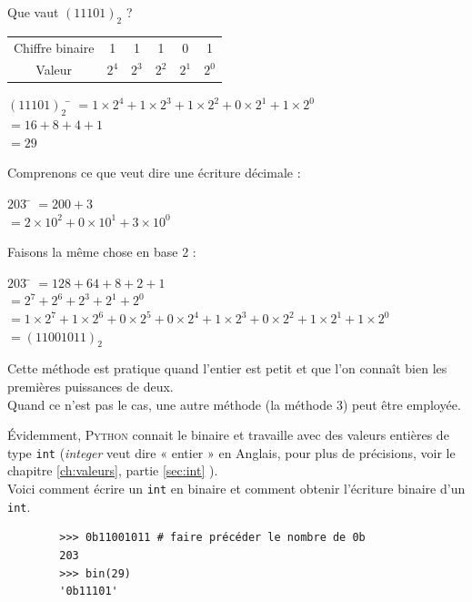 \begin{methode}
    Que vaut $(11101)_2$ ?
    \begin{center}
        \alternaterowcolors[UGLiPurple]
        \begin{tabular}{CCCCCC}
            Chiffre binaire & 1     & 1     & 1     & 0     & 1     \\
            Valeur          & $2^4$ & $2^3$ & $2^2$ & $2^1$ & $2^0$ \\
        \end{tabular}
    \end{center}
    \begin{tabbing}
        $(11101)_2$	\= 	$=1\times 2^4+1\times 2^3+1\times 2^2+0\times 2^1+1\times 2^0$	\\
        \>	$=16+8+4+1$	\\
        \>	$=29$
    \end{tabbing}\nopagebreak
\end{methode}

\begin{methode}
    Comprenons ce que veut dire une écriture décimale :
    \begin{tabbing}
        $203$	\= 	$=200+3$	\\

        \>	$=2\times 10^2+0\times 10^1+3\times 10^0$
    \end{tabbing}
    Faisons la même chose en base 2 :
    \begin{tabbing}
        $203$	\= 	$=128+64+8+2+1$	\\

        \>	$=2^7+2^6+2^3+2^1+2^0$	\\

        \>	$=1\times 2^7+1\times 2^6+0\times 2^5 + 0\times 2^4 +1\times 2^3+0\times 2^2 + 1\times
            2^1+1\times 2^0$	\\

        \> $=(11001011)_2$
    \end{tabbing}
    Cette méthode est pratique quand l'entier est petit et que l'on connaît bien les premières puissances de deux.\\
    Quand ce n'est pas le cas, une autre méthode (la méthode 3) peut être employée.

\end{methode}
\'Evidemment, \textsc{Python} connait le binaire et travaille avec des valeurs entières de type \texttt{int} (\textit{integer} veut dire « entier » en Anglais, pour plus de précisions, voir le chapitre \ref{ch:valeurs}, partie \ref{sec:int} ).\\
Voici comment écrire un \texttt{int} en binaire et comment obtenir l'écriture
binaire d'un \texttt{int}.
\begin{pys}
    \begin{verbatim}
        >>> 0b11001011 # faire précéder le nombre de 0b
        203
        >>> bin(29)
        '0b11101'
    \end{verbatim}
\end{pys}

